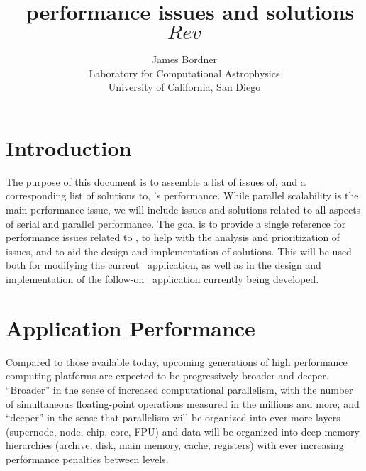 \documentclass{article}
\begin{document}
\title{ {\huge \enzo\ performance issues and solutions}  \\ \vspace{0.1in}
     \vspace{-0.1in} $Rev$ }
\author{ James Bordner \\
        Laboratory for Computational Astrophysics\\
        University of California, San Diego}
\maketitle

\section{Introduction}

The purpose of this document is to assemble a list of issues of, and a
corresponding list of solutions to, \enzo's performance.  While
parallel scalability is the main performance issue, we will include
issues and solutions related to all aspects of serial and parallel
performance.  The goal is to provide a single reference for
performance issues related to \enzo, to help with the analysis and
prioritization of issues, and to aid the design and implementation of
solutions.  This will be used both for modifying the current \enzo\
application, as well as in the design and implementation of the
follow-on \cello\ application currently being developed.

\section{Application Performance}

Compared to those available today, upcoming generations of high
performance computing platforms are expected to be progressively
broader and deeper.  ``Broader'' in the sense of increased
computational parallelism, with the number of simultaneous
floating-point operations measured in the millions and more; and
``deeper'' in the sense that parallelism will be organized into ever
more layers (supernode, node, chip, core, FPU) and data will be
organized into deep memory hierarchies (archive, disk, main memory,
cache, registers) with ever increasing performance penalties between
levels.
\end{document}
